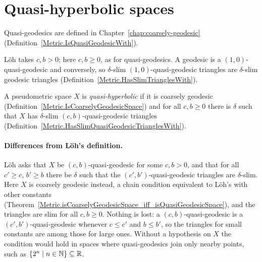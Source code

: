 


\section*{Quasi-hyperbolic spaces}

Quasi-geodesics are defined in Chapter~\ref{chap:coarsely-geodesic}
(Definition~\ref{Metric.IsQuasiGeodesicWith}).


L\"oh takes $c, b > 0$; here $c, b \ge 0$, as for quasi-geodesics. A geodesic is a
$(1, 0)$-quasi-geodesic and conversely, so $\delta$-slim $(1, 0)$-quasi-geodesic triangles are
$\delta$-slim geodesic triangles (Definition~\ref{Metric.HasSlimTrianglesWith}).

\begin{definition}
  \label{Metric.IsQuasiHyperbolic}
  A pseudometric space $X$ is \emph{quasi-hyperbolic} if it is coarsely geodesic
  (Definition~\ref{Metric.IsCoarselyGeodesicSpace}) and for all $c, b \ge 0$ there is $\delta$ such
  that $X$ has $\delta$-slim $(c, b)$-quasi-geodesic triangles
  (Definition~\ref{Metric.HasSlimQuasiGeodesicTrianglesWith}).
\end{definition}

\paragraph{Differences from L\"oh's definition.} L\"oh asks that $X$ be $(c, b)$-quasi-geodesic
for some $c, b > 0$, and that for all $c' \ge c$, $b' \ge b$ there be $\delta$ such that the
$(c', b')$-quasi-geodesic triangles are $\delta$-slim. Here $X$ is coarsely geodesic instead, a
chain condition equivalent to L\"oh's with other constants
(Theorem~\ref{Metric.isCoarselyGeodesicSpace_iff_isQuasiGeodesicSpace}), and the triangles are
slim for all $c, b \ge 0$. Nothing is lost: a $(c, b)$-quasi-geodesic is a
$(c', b')$-quasi-geodesic whenever $c \le c'$ and $b \le b'$, so the
triangles for small constants are among those for large ones. Without a hypothesis on $X$ the
condition would hold in spaces where quasi-geodesics join only nearby points, such as
$\{2^n \mid n \in \mathbb{N}\} \subseteq \mathbb{R}$.

